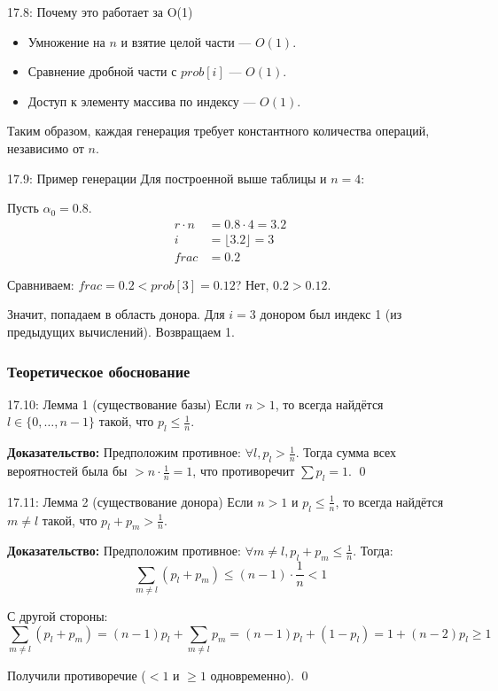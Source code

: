 \documentclass[a4paper,12pt]{article}
\begin{document}
	\begin{remarkbox}{17.8: Почему это работает за O(1)}
		\begin{itemize}
			\item Умножение на \(n\) и взятие целой части — \(O(1)\).
			\item Сравнение дробной части с \(prob[i]\) — \(O(1)\).
			\item Доступ к элементу массива по индексу — \(O(1)\).
		\end{itemize}
		Таким образом, каждая генерация требует константного количества операций, независимо от \(n\).
	\end{remarkbox}
	
	\begin{examplebox}{17.9: Пример генерации}
		Для построенной выше таблицы и \(n=4\):
		
		Пусть \(\alpha_0 = 0.8\).
		\begin{align*}
			r \cdot n &= 0.8 \cdot 4 = 3.2 \\
			i &= \lfloor 3.2 \rfloor = 3 \\
			frac &= 0.2
		\end{align*}
		
		Сравниваем: \(frac = 0.2 < prob[3] = 0.12\)? Нет, \(0.2 > 0.12\).
		
		Значит, попадаем в область донора. Для \(i=3\) донором был индекс 1 (из предыдущих вычислений). Возвращаем 1.
	\end{examplebox}
	
	\subsubsection{Теоретическое обоснование}
	
	\begin{lemmabox}{17.10: Лемма 1 (существование базы)}
		Если \(n > 1\), то всегда найдётся \(l \in \{0, \dots, n-1\}\) такой, что \(p_l \le \frac{1}{n}\).
		
		\textbf{Доказательство:} Предположим противное: \(\forall l, p_l > \frac{1}{n}\). Тогда сумма всех вероятностей была бы \(> n \cdot \frac{1}{n} = 1\), что противоречит \(\sum p_l = 1\). \qed
	\end{lemmabox}
	
	\begin{lemmabox}{17.11: Лемма 2 (существование донора)}
		Если \(n > 1\) и \(p_l \le \frac{1}{n}\), то всегда найдётся \(m \neq l\) такой, что \(p_l + p_m > \frac{1}{n}\).
		
		\textbf{Доказательство:} Предположим противное: \(\forall m \neq l, p_l + p_m \le \frac{1}{n}\). Тогда:
		\[ \sum_{m \neq l} (p_l + p_m) \le (n-1) \cdot \frac{1}{n} < 1 \]
		
		С другой стороны:
		\[ \sum_{m \neq l} (p_l + p_m) = (n-1)p_l + \sum_{m \neq l} p_m = (n-1)p_l + (1 - p_l) = 1 + (n-2)p_l \ge 1 \]
		
		Получили противоречие (\(< 1\) и \(\ge 1\) одновременно). \qed
	\end{lemmabox}
	
\end{document}
